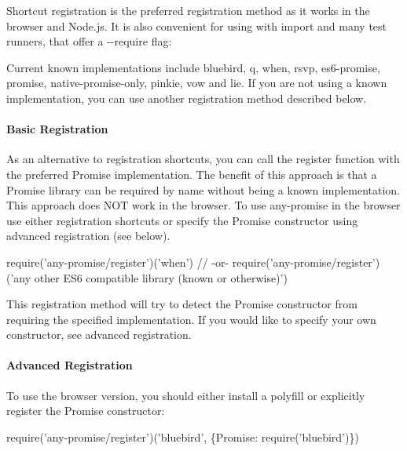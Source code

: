 Shortcut registration is the preferred registration method as it works in the browser and Node.\+js. It is also convenient for using with {\ttfamily import} and many test runners, that offer a {\ttfamily -\/-\/require} flag\+:




Current known implementations include {\ttfamily bluebird}, {\ttfamily q}, {\ttfamily when}, {\ttfamily rsvp}, {\ttfamily es6-\/promise}, {\ttfamily promise}, {\ttfamily native-\/promise-\/only}, {\ttfamily pinkie}, {\ttfamily vow} and {\ttfamily lie}. If you are not using a known implementation, you can use another registration method described below.

\paragraph*{Basic Registration}

As an alternative to registration shortcuts, you can call the {\ttfamily register} function with the preferred {\ttfamily Promise} implementation. The benefit of this approach is that a {\ttfamily Promise} library can be required by name without being a known implementation. This approach does N\+OT work in the browser. To use {\ttfamily any-\/promise} in the browser use either registration shortcuts or specify the {\ttfamily Promise} constructor using advanced registration (see below).


\begin{DoxyCode}
require('any-promise/register')('when')
// -or- require('any-promise/register')('any other ES6 compatible library (known or otherwise)')
\end{DoxyCode}


This registration method will try to detect the {\ttfamily Promise} constructor from requiring the specified implementation. If you would like to specify your own constructor, see advanced registration.

\paragraph*{Advanced Registration}

To use the browser version, you should either install a polyfill or explicitly register the {\ttfamily Promise} constructor\+:


\begin{DoxyCode}
require('any-promise/register')('bluebird', \{Promise: require('bluebird')\})
\end{DoxyCode}


